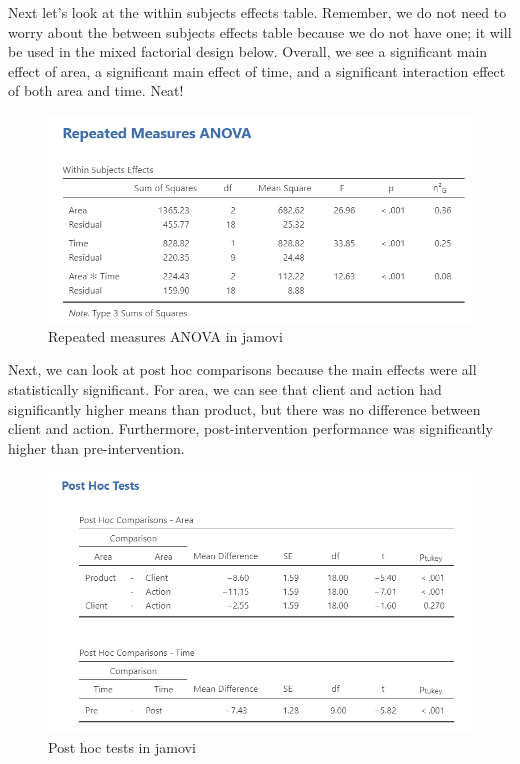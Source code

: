 \documentclass[
]{book}
\begin{document}
Next let's look at the within subjects effects table. Remember, we do not need to worry about the between subjects effects table because we do not have one; it will be used in the mixed factorial design below. Overall, we see a significant main effect of area, a significant main effect of time, and a significant interaction effect of both area and time. Neat!

\begin{figure}

{\centering \includegraphics[width=1\linewidth]{images/06-factorial-anova/rm-factorial_results} 

}

\caption{Repeated measures ANOVA in jamovi}\label{fig:unnamed-chunk-6}
\end{figure}

Next, we can look at post hoc comparisons because the main effects were all statistically significant. For area, we can see that client and action had significantly higher means than product, but there was no difference between client and action. Furthermore, post-intervention performance was significantly higher than pre-intervention.

\begin{figure}

{\centering \includegraphics[width=1\linewidth]{images/06-factorial-anova/rm-factorial_tukey} 

}

\caption{Post hoc tests in jamovi}\label{fig:unnamed-chunk-7}
\end{figure}
\end{document}
